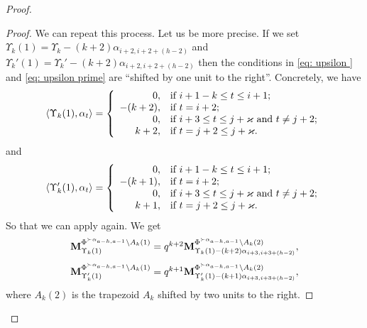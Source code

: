 \begin{proof}
\begin{proof}
We can repeat this process. 
Let us be more precise. 
If we set $\Upsilon_k(1)= \Upsilon_k-(k+2)\alpha_{i+2,i+2+(h-2)}$ and $\Upsilon_k'(1)= \Upsilon_k'-(k+2)\alpha_{i+2,i+2+(h-2)}$ then the conditions in \eqref{eq: upsilon } and \eqref{eq: upsilon prime} are ``shifted by one unit to the right''. 
Concretely, we have
\begin{equation} \label{eq: upsilon A}
    \langle \Upsilon_k(1) , \alpha_t \rangle = \left\{  
    \begin{array}{rl}
      0,    & \mbox{if } i+1-k \leq t \leq i+1; \\
      -(k+2),    & \mbox{if } t=i+2; \\
      0,  & \mbox{if }  i+3\leq  t \leq j +\varkappa \mbox{ and } t\neq j+2;\\
      k+2, & \mbox{if }  t=j+2 \leq j+\varkappa.
    \end{array} \right.
\end{equation}
and 
\begin{equation} \label{eq: upsilon prime A}
    \langle \Upsilon_k'(1) , \alpha_t \rangle = \left\{  
    \begin{array}{rl}
      0,    & \mbox{if } i+1-k \leq t \leq i+1; \\
      -(k+1),    & \mbox{if } t=i+2; \\
      0,  & \mbox{if }  i+3\leq  t \leq j +\varkappa \mbox{ and } t\neq j+2;\\
      k+1, & \mbox{if }  t=j+2 \leq j+\varkappa.
    \end{array} \right.
\end{equation}
So that we can apply  again. 
We get
\begin{equation}
\begin{array}{l}
     \mathbf{M}_{\Upsilon_k(1)}^{\Phi^{\succ \alpha_{a-h,a-1}} \setminus A_{k}(1)} = q^{k+2} \mathbf{M}_{\Upsilon_k(1)-(k+2)\alpha_{i+3,i+3+(h-2)}}^{\Phi^{\succ \alpha_{a-h,a-1}} \setminus A_{k}(2)},   \\[10pt]
  \mathbf{M}_{\Upsilon_k'(1)}^{\Phi^{\succ \alpha_{a-h,a-1}} \setminus A_{k}(1)} =q^{k+1} \mathbf{M}_{\Upsilon_k'(1)-(k+1)\alpha_{i+3,i+3+(h-2)}}^{\Phi^{\succ \alpha_{a-h,a-1}} \setminus A_{k}(2)},
\end{array}
\end{equation}
where $A_k(2)$ is the trapezoid $A_k$ shifted by two units to the right. 


\end{proof}
\end{proof}
